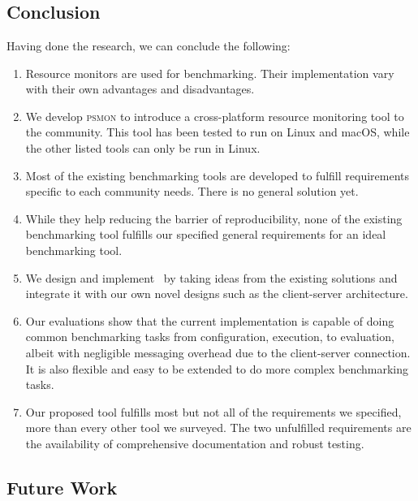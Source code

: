 \chapter{\chConclusion}
\label{ch:conclusion}



\section{Conclusion}

Having done the research, we can conclude the following:

\begin{enumerate}
    \item Resource monitors are used for benchmarking. Their implementation vary with their own advantages and disadvantages.
    \item We develop \textsc{psmon} to introduce a cross-platform resource monitoring tool to the community. This tool has been tested to run on Linux and macOS, while the other listed tools can only be run in Linux.
    \item Most of the existing benchmarking tools are developed to fulfill requirements specific to each community needs. There is no general solution yet.
    \item While they help reducing the barrier of reproducibility, none of the existing benchmarking tool fulfills our specified general requirements for an ideal benchmarking tool.
    \item We design and implement \OurBenchmarkingTool~by taking ideas from the existing solutions and integrate it with our own novel designs such as the client-server architecture.
    \item Our evaluations show that the current implementation is capable of doing common benchmarking tasks from configuration, execution, to evaluation, albeit with negligible messaging overhead due to the client-server connection. It is also flexible and easy to be extended to do more complex benchmarking tasks.
    \item Our proposed tool fulfills most but not all of the requirements we specified, more than every other tool we surveyed. The two unfulfilled requirements are the availability of comprehensive documentation and robust testing.
\end{enumerate}

\section{Future Work}

